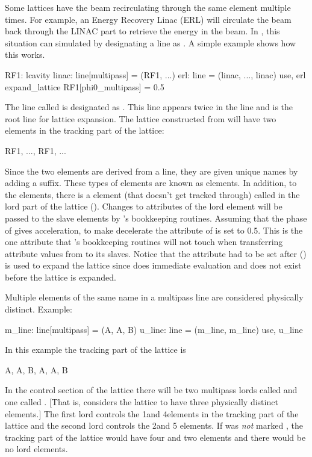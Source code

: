Some lattices have the beam recirculating through the same element
multiple times. For example, an Energy Recovery Linac (ERL) will
circulate the beam back through the LINAC part to retrieve the energy
in the beam. In \bmad, this situation can simulated by designating a line
as . A simple example shows how this
works.
\begin{example}
  RF1: lcavity
  linac: line[multipass] = (RF1, ...)
  erl: line = (linac, ..., linac)
  use, erl
  expand_lattice
  RF1[phi0_multipass] = 0.5
\end{example}
The line called  is designated as . This
 line appears twice in the line  and  is the
root line for lattice expansion. The lattice constructed from 
will have two  elements in the tracking part of the lattice:
\begin{example}
  RF1, ..., RF1, ...
\end{example}
Since the two elements are derived from a  line, they
are given unique names by adding a  suffix. These types of
elements are known as  elements. In addition, to
the  elements, there is a 
element (that doesn't get tracked through) called  in the lord
part of the lattice ().  Changes to attributes of
the lord  element will be passed to the slave elements by
\bmad's bookkeeping routines. Assuming that the phase of 
gives acceleration, to make  decelerate the
 attribute of  is set to 0.5. This is
the one attribute that \bmad's bookkeeping routines will not touch
when transferring attribute values from  to its slaves. Notice
that the  attribute had to be set after
 () is used to expand the lattice
since \bmad does immediate evaluation and  does not exist
before the lattice is expanded.

Multiple elements of the same name in a multipass line are considered 
physically distinct. Example:
\begin{example}
  m_line: line[multipass] = (A, A, B)
  u_line: line = (m_line, m_line)
  use, u_line
\end{example}
In this example the tracking part of the lattice is
\begin{example}
  A, A, B, A, A, B
\end{example}
In the control section of the lattice there will be two multipass
lords called  and one called . [That is, \bmad considers
the lattice to have three physically distinct elements.] The first
 lord controls the 1\St and 4\Th elements in the tracking part
of the lattice and the second  lord controls the 2\Nd and 5\Th
elements. If  was {\em not} marked , the
tracking part of the lattice would have four  and two 
elements and there would be no lord elements.

